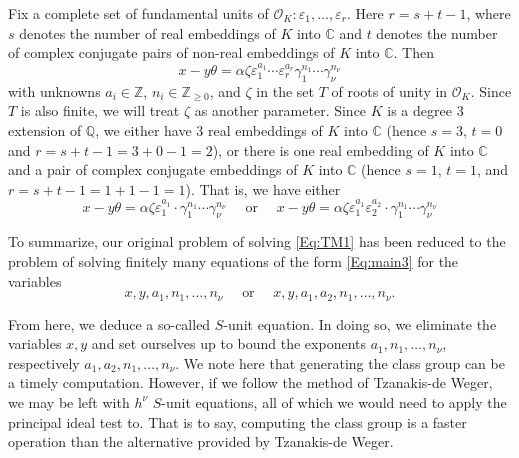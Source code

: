 Fix a complete set of fundamental units of $\mathcal{O}_K: \varepsilon_1, \dots, \varepsilon_r$. Here $r = s + t -1$, where $s$ denotes the number of real embeddings of $K$ into $\mathbb{C}$ and $t$ denotes the number of complex conjugate pairs of non-real embeddings of $K$ into $\mathbb{C}$. Then
\begin{equation} \label{Eq:main2}
x-y\theta = \alpha \zeta \varepsilon_1^{a_1} \cdots \varepsilon_r^{a_r}\gamma_1^{n_1}\cdots \gamma_{\nu}^{n_{\nu}}
\end{equation}
with unknowns $a_i \in \mathbb{Z}$, $n_i \in \mathbb{Z}_{\geq 0}$, and $\zeta$ in the set $T$ of roots of unity in $\mathcal{O}_K$. Since $T$ is also finite, we will treat $\zeta$ as another parameter. Since $K$ is a degree $3$ extension of $\mathbb{Q}$, we either have $3$ real embeddings of $K$ into $\mathbb{C}$ (hence $s = 3$, $t = 0$ and $r = s+ t -1 = 3 + 0 -1 = 2$), or there is one real embedding of $K$ into $\mathbb{C}$ and a pair of complex conjugate embeddings of $K$ into $\mathbb{C}$ (hence $s = 1$, $t = 1$, and $r = s +t -1 = 1 + 1 -1 = 1$). 
That is, we have either  
\begin{equation} \label{Eq:main3}
x-y\theta = \alpha \zeta \varepsilon_1^{a_1} \cdot \gamma_1^{n_1}\cdots \gamma_{\nu}^{n_{\nu}}
\quad \text{ or } \quad 
x-y\theta = \alpha \zeta \varepsilon_1^{a_1} \varepsilon_2^{a_2}\cdot \gamma_1^{n_1}\cdots \gamma_{\nu}^{n_{\nu}}
\end{equation}

To summarize, our original problem of solving \eqref{Eq:TM1} has been reduced to the problem of solving finitely many equations of the form \eqref{Eq:main3} for the variables 
\[x,y, a_1, n_1, \dots, n_{\nu} \quad \text{ or } \quad x,y, a_1,a_2, n_1, \dots, n_{\nu} .\] 

From here, we deduce a so-called $S$-unit equation. In doing so, we eliminate the variables $x,y$ and set ourselves up to bound the exponents $a_1,n_1, \dots, n_{\nu}$, respectively $a_1,a_2,n_1, \dots, n_{\nu}$. We note here that generating the class group can be a timely computation. However, if we follow the method of Tzanakis-de Weger, we may be left with $h^{\nu}$ $S$-unit equations, all of which we would need to apply the principal ideal test to. That is to say, computing the class group is a faster operation than the alternative provided by Tzanakis-de Weger. 


